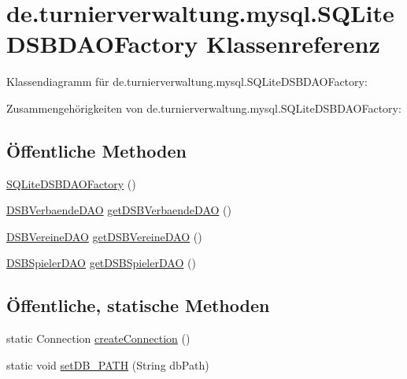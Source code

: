 \hypertarget{classde_1_1turnierverwaltung_1_1mysql_1_1_s_q_lite_d_s_b_d_a_o_factory}{}\section{de.\+turnierverwaltung.\+mysql.\+S\+Q\+Lite\+D\+S\+B\+D\+A\+O\+Factory Klassenreferenz}
\label{classde_1_1turnierverwaltung_1_1mysql_1_1_s_q_lite_d_s_b_d_a_o_factory}


Klassendiagramm für de.\+turnierverwaltung.\+mysql.\+S\+Q\+Lite\+D\+S\+B\+D\+A\+O\+Factory\+:


Zusammengehörigkeiten von de.\+turnierverwaltung.\+mysql.\+S\+Q\+Lite\+D\+S\+B\+D\+A\+O\+Factory\+:
\subsection*{Öffentliche Methoden}
\begin{DoxyCompactItemize}
\item 
\hyperlink{classde_1_1turnierverwaltung_1_1mysql_1_1_s_q_lite_d_s_b_d_a_o_factory_aa0416d33cd196d0717a4a8abdccd3a84}{S\+Q\+Lite\+D\+S\+B\+D\+A\+O\+Factory} ()
\item 
\hyperlink{interfacede_1_1turnierverwaltung_1_1mysql_1_1_d_s_b_verbaende_d_a_o}{D\+S\+B\+Verbaende\+D\+AO} \hyperlink{classde_1_1turnierverwaltung_1_1mysql_1_1_s_q_lite_d_s_b_d_a_o_factory_a854ff23a39514ec96fcf838ba42b93d2}{get\+D\+S\+B\+Verbaende\+D\+AO} ()
\item 
\hyperlink{interfacede_1_1turnierverwaltung_1_1mysql_1_1_d_s_b_vereine_d_a_o}{D\+S\+B\+Vereine\+D\+AO} \hyperlink{classde_1_1turnierverwaltung_1_1mysql_1_1_s_q_lite_d_s_b_d_a_o_factory_a8c0aef14d2278c70c63424413a2b489b}{get\+D\+S\+B\+Vereine\+D\+AO} ()
\item 
\hyperlink{interfacede_1_1turnierverwaltung_1_1mysql_1_1_d_s_b_spieler_d_a_o}{D\+S\+B\+Spieler\+D\+AO} \hyperlink{classde_1_1turnierverwaltung_1_1mysql_1_1_s_q_lite_d_s_b_d_a_o_factory_ad2ffd99dda42a64bbbeb3dd65ada5936}{get\+D\+S\+B\+Spieler\+D\+AO} ()
\end{DoxyCompactItemize}
\subsection*{Öffentliche, statische Methoden}
\begin{DoxyCompactItemize}
\item 
static Connection \hyperlink{classde_1_1turnierverwaltung_1_1mysql_1_1_s_q_lite_d_s_b_d_a_o_factory_a17530c2c51004522fae244020b617036}{create\+Connection} ()
\item 
static void \hyperlink{classde_1_1turnierverwaltung_1_1mysql_1_1_s_q_lite_d_s_b_d_a_o_factory_a3af59f53873fa4ace289578af275a6cd}{set\+D\+B\+\_\+\+P\+A\+TH} (String db\+Path)
\end{DoxyCompactItemize}
